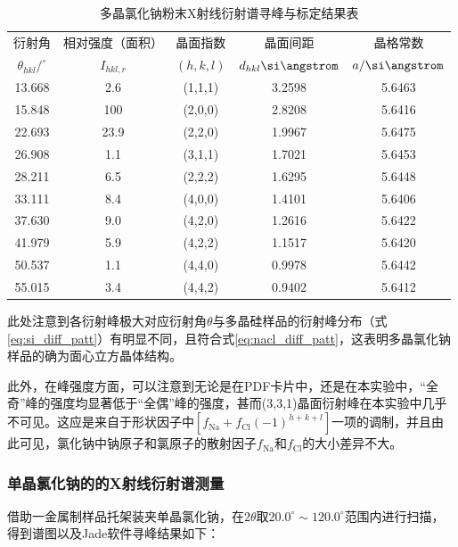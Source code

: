 \documentclass{thuemp}
\begin{document}
\begin{table}[H]
    \centering
    \captionnamefont{\wuhao\bf\heiti}
    \captiontitlefont{\wuhao\bf\heiti}
    \caption{多晶氯化钠粉末X射线衍射谱寻峰与标定结果表}
    \label{tab:nacl_xrd_multi}
    \liuhao
    \begin{tabular}{ccccc}
        \toprule
        衍射角 & 相对强度（面积）& 晶面指数 & 晶面间距 & 晶格常数 \\
        $\theta_{hkl}/^\circ$ & $I_{hkl,r}$ & $(h,k,l)$ & $d_{hkl}\text{\si\angstrom}$ & $a/\text{\si\angstrom}$ \\
        \midrule
        13.668 &  2.6 & (1,1,1) & 3.2598 & 5.6463 \\
        15.848 &  100 & (2,0,0) & 2.8208 & 5.6416 \\
        22.693 & 23.9 & (2,2,0) & 1.9967 & 5.6475 \\
        26.908 &  1.1 & (3,1,1) & 1.7021 & 5.6453 \\
        28.211 &  6.5 & (2,2,2) & 1.6295 & 5.6448 \\
        33.111 &  8.4 & (4,0,0) & 1.4101 & 5.6406 \\
        37.630 &  9.0 & (4,2,0) & 1.2616 & 5.6422 \\
        41.979 &  5.9 & (4,2,2) & 1.1517 & 5.6420 \\
        50.537 &  1.1 & (4,4,0) & 0.9978 & 5.6442 \\
        55.015 &  3.4 & (4,4,2) & 0.9402 & 5.6412 \\
        \bottomrule
    \end{tabular}
\end{table}

此处注意到各衍射峰极大对应衍射角$\theta$与多晶硅样品的衍射峰分布（式\ref{eq:si_diff_patt}）有明显不同，且符合式\ref{eq:nacl_diff_patt}，这表明多晶氯化钠样品的确为面心立方晶体结构。

此外，在峰强度方面，可以注意到无论是在PDF卡片中，还是在本实验中，“全奇”峰的强度均显著低于“全偶”峰的强度，甚而(3,3,1)晶面衍射峰在本实验中几乎不可见。这应是来自于形状因子中$\left[f_\text{Na} + f_\text{Cl} (-1)^{h+k+l}\right]$一项的调制，并且由此可见，氯化钠中钠原子和氯原子的散射因子$f_\text{Na}$和$f_\text{Cl}$的大小差异不大。

\subsubsection{单晶氯化钠的的X射线衍射谱测量}

借助一金属制样品托架装夹单晶氯化钠，在$2\theta$取$20.0^\circ \sim 120.0^\circ$范围内进行扫描，得到谱图以及Jade软件寻峰结果如下：
\end{document}
